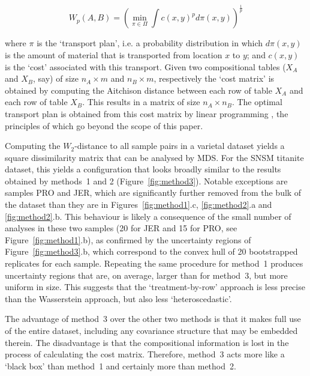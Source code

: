 \documentclass{article}
\begin{document}
\begin{equation}
  W_p(A,B) = \left(
  \min\limits_{\pi\in\Pi}\int c(x,y)^p d\pi(x,y)
  \right)^{\frac{1}{p}}  
  \label{eq:Wp2D}
\end{equation}

\noindent where $\pi$ is the `transport plan', i.e. a probability
distribution in which $d\pi(x,y)$ is the amount of material that is
transported from location $x$ to $y$; and $c(x,y)$ is the `cost'
associated with this transport. Given two compositional tables ($X_A$
and $X_B$, say) of size ${n_A}\times{m}$ and ${n_B}\times{m}$,
respectively the `cost matrix' is obtained by computing the Aitchison
distance between each row of table $X_A$ and each row of table
$X_B$. This results in a matrix of size ${n_A}\times{n_B}$. The
optimal transport plan is obtained from this cost matrix by linear
programming \cite{villani2021}, the principles of which go beyond the
scope of this paper.\medskip

Computing the $W_2$-distance to all sample pairs in a varietal dataset
yields a square dissimilarity matrix that can be analysed by MDS.  For
the SNSM titanite dataset, this yields a configuration that looks
broadly similar to the results obtained by methods~1 and 2
(Figure~\ref{fig:method3}). Notable exceptions are samples PRO and
JER, which are significantly further removed from the bulk of the
dataset than they are in Figures~\ref{fig:method1}.c,
\ref{fig:method2}.a and \ref{fig:method2}.b. This behaviour is likely
a consequence of the small number of analyses in these two samples (20
for JER and 15 for PRO, see Figure~\ref{fig:method1}.b), as confirmed
by the uncertainty regions of Figure~\ref{fig:method3}.b, which
correspond to the convex hull of 20 bootstrapped replicates for each
sample. Repeating the same procedure for method~1 produces uncertainty
regions that are, on average, larger than for method~3, but more
uniform in size. This suggests that the `treatment-by-row' approach is
less precise than the Wasserstein approach, but also less
`heteroscedastic'. \medskip

The advantage of method~3 over the other two methods is that it makes
full use of the entire dataset, including any covariance structure
that may be embedded therein. The disadvantage is that the
compositional information is lost in the process of calculating the
cost matrix. Therefore, method~3 acts more like a `black box' than
method~1 and certainly more than method~2.\medskip
\end{document}
